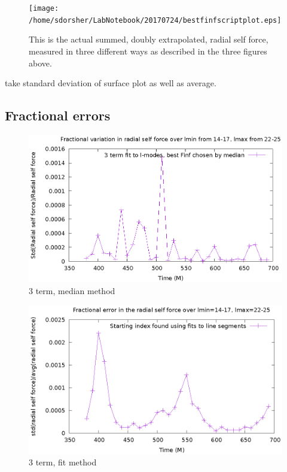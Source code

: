 \begin{figure}
  \texttt{[image: /home/sdorsher/LabNotebook/20170724/bestfinfscriptplot.eps]}
  \caption{This is the actual summed, doubly extrapolated, radial self force, measured in three different ways as described in the three figures above.}
\end{figure}



take standard deviation of surface plot as well as average.


\subsection{Fractional errors}
\begin{figure}
  \includegraphics{fractionalErrorSelfForceOverTime3termMedian}
  \caption{3 term, median method}
\end{figure}

\begin{figure}
  \includegraphics{fractionalErrorOverTimeFits}
  \caption{3 term, fit method}
\end{figure}

